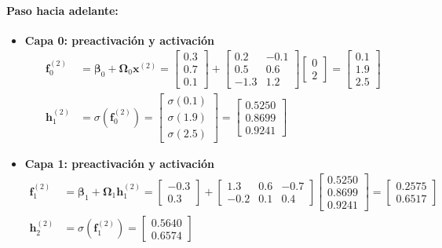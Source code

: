 \documentclass[10pt,a4paper]{article}
\begin{document}
\paragraph{Paso hacia adelante:}
\begin{itemize}\itemsep-3pt   
    \item \textbf{Capa 0: preactivación y activación}
    \begin{align*}
    \mathbf{f}_0^{(2)} &= \boldsymbol{\beta}_0 + \boldsymbol{\Omega}_0 \mathbf{x}^{(2)} = \begin{bmatrix} 0.3 \\ 0.7 \\ 0.1 \end{bmatrix} + \begin{bmatrix} 0.2 & -0.1 \\ 0.5 & 0.6 \\ -1.3 & 1.2 \end{bmatrix} \begin{bmatrix} 0 \\ 2 \end{bmatrix} = \begin{bmatrix} 0.1 \\ 1.9 \\ 2.5 \end{bmatrix} \\[0.1cm]
    \mathbf{h}_1^{(2)} &= \sigma(\mathbf{f}_0^{(2)}) = \begin{bmatrix} \sigma(0.1) \\ \sigma(1.9) \\ \sigma(2.5) \end{bmatrix} = \begin{bmatrix} 0.5250 \\ 0.8699 \\ 0.9241 \end{bmatrix}
    \end{align*}

    \item \textbf{Capa 1: preactivación y activación}
    \begin{align*}
    \mathbf{f}_1^{(2)} &= \boldsymbol{\beta}_1 + \boldsymbol{\Omega}_1 \mathbf{h}_1^{(2)} = \begin{bmatrix} -0.3 \\ 0.3 \end{bmatrix} + \begin{bmatrix} 1.3 & 0.6 & -0.7 \\ -0.2 & 0.1 & 0.4 \end{bmatrix} \begin{bmatrix} 0.5250 \\ 0.8699 \\ 0.9241 \end{bmatrix} = \begin{bmatrix} 0.2575 \\ 0.6517 \end{bmatrix} \\[0.1cm]
    \mathbf{h}_2^{(2)} &= \sigma(\mathbf{f}_1^{(2)}) = \begin{bmatrix} 0.5640 \\ 0.6574 \end{bmatrix}
    \end{align*}


\end{itemize}
\end{document}
